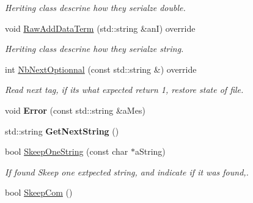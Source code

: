 \begin{DoxyCompactItemize}
\begin{DoxyCompactList}\small\item\em Heriting class descrine how they serialze double. \end{DoxyCompactList}\item 
void \hyperlink{classMMVII_1_1cIXml__Ar2007_a38eada2ba6adc67101b1d7a7ccf55d7c}{Raw\+Add\+Data\+Term} (std\+::string \&anI) override\hypertarget{classMMVII_1_1cIXml__Ar2007_a38eada2ba6adc67101b1d7a7ccf55d7c}{}\label{classMMVII_1_1cIXml__Ar2007_a38eada2ba6adc67101b1d7a7ccf55d7c}

\begin{DoxyCompactList}\small\item\em Heriting class descrine how they serialze string. \end{DoxyCompactList}\item 
int \hyperlink{classMMVII_1_1cIXml__Ar2007_a10bbd35d61e6fbf11c468c4752524219}{Nb\+Next\+Optionnal} (const std\+::string \&) override\hypertarget{classMMVII_1_1cIXml__Ar2007_a10bbd35d61e6fbf11c468c4752524219}{}\label{classMMVII_1_1cIXml__Ar2007_a10bbd35d61e6fbf11c468c4752524219}

\begin{DoxyCompactList}\small\item\em Read next tag, if its what expected return 1, restore state of file. \end{DoxyCompactList}\item 
void {\bfseries Error} (const std\+::string \&a\+Mes)\hypertarget{classMMVII_1_1cIXml__Ar2007_a1884ccfebe6ff8327839a29f2909cd60}{}\label{classMMVII_1_1cIXml__Ar2007_a1884ccfebe6ff8327839a29f2909cd60}

\item 
std\+::string {\bfseries Get\+Next\+String} ()\hypertarget{classMMVII_1_1cIXml__Ar2007_a3456fa5b5a8cbd562e41effacbd9c494}{}\label{classMMVII_1_1cIXml__Ar2007_a3456fa5b5a8cbd562e41effacbd9c494}

\item 
bool \hyperlink{classMMVII_1_1cIXml__Ar2007_a87336c1362f17fa17abcfc7450e81981}{Skeep\+One\+String} (const char $\ast$a\+String)\hypertarget{classMMVII_1_1cIXml__Ar2007_a87336c1362f17fa17abcfc7450e81981}{}\label{classMMVII_1_1cIXml__Ar2007_a87336c1362f17fa17abcfc7450e81981}

\begin{DoxyCompactList}\small\item\em If found Skeep one extpected string, and indicate if it was found,. \end{DoxyCompactList}\item 
bool \hyperlink{classMMVII_1_1cIXml__Ar2007_ae52cdfc2c171fcbbf2c75dd79d9cf81d}{Skeep\+Com} ()\hypertarget{classMMVII_1_1cIXml__Ar2007_ae52cdfc2c171fcbbf2c75dd79d9cf81d}{}\label{classMMVII_1_1cIXml__Ar2007_ae52cdfc2c171fcbbf2c75dd79d9cf81d}


\end{DoxyCompactItemize}
